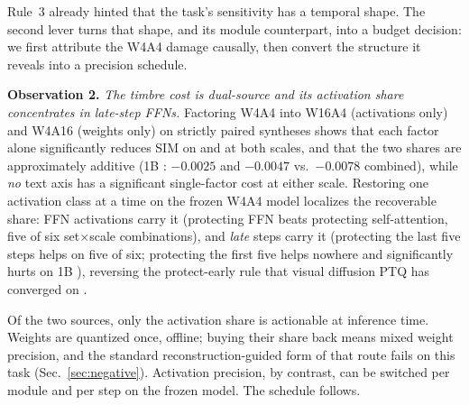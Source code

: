 Rule~3 already hinted that the task's sensitivity has a temporal shape. The second lever turns that shape, and its module counterpart, into a budget decision: we first attribute the W4A4 damage causally, then convert the structure it reveals into a precision schedule.

\noindent\textbf{Observation 2.} \emph{The timbre cost is dual-source and its activation share concentrates in late-step FFNs.} Factoring W4A4 into W16A4 (activations only) and W4A16 (weights only) on strictly paired syntheses shows that each factor alone significantly reduces SIM on \zh{} and \en{} at both scales, and that the two shares are approximately additive (1B \en{}: $-0.0025$ and $-0.0047$ vs.\ $-0.0078$ combined), while \emph{no} text axis has a significant single-factor cost at either scale. Restoring one activation class at a time on the frozen W4A4 model localizes the recoverable share: FFN activations carry it (protecting FFN beats protecting self-attention, five of six set$\times$scale combinations), and \emph{late} steps carry it (protecting the last five steps helps on five of six; protecting the first five helps nowhere and significantly hurts on 1B \hard{}), reversing the protect-early rule that visual diffusion PTQ has converged on \citep{li2023qdiffusion,shang2023ptq4dm,zhao2025viditq}.

Of the two sources, only the activation share is actionable at inference time. Weights are quantized once, offline; buying their share back means mixed weight precision, and the standard reconstruction-guided form of that route fails on this task (Sec.~\ref{sec:negative}). Activation precision, by contrast, can be switched per module and per step on the frozen model. The schedule follows.

